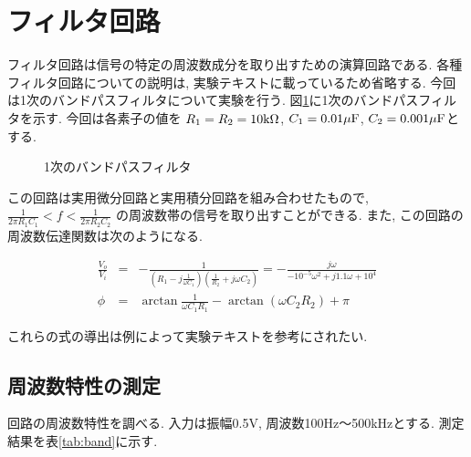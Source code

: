 \documentclass[titlepage]{jsarticle}
\begin{document}
\section{フィルタ回路}
    フィルタ回路は信号の特定の周波数成分を取り出すための演算回路である.
    各種フィルタ回路についての説明は,
    実験テキスト\cite{text}に載っているため省略する.
    今回は1次のバンドパスフィルタについて実験を行う.
    図\ref{fig:band}に1次のバンドパスフィルタを示す.
    今回は各素子の値を
    $R_1 = R_2 = 10\rm{k\Omega}$,
    $C_1 = 0.01\rm{\mu F}$,
    $C_2 = 0.001\rm{\mu F}$とする.

    \begin{figure}[h]
        \centering
        \caption{1次のバンドパスフィルタ}
        \label{fig:band}
    \end{figure}

    この回路は実用微分回路と実用積分回路を組み合わせたもので,
    $\displaystyle\frac{1}{2\pi R_1C_1} < f < \frac{1}{2\pi R_2C_2}$
    の周波数帯の信号を取り出すことができる.
    また, この回路の周波数伝達関数は次のようになる.

    \begin{eqnarray}
        \frac{V_o}{V_i} &=& -\frac{1}{\left(R_1-j\frac{1}{\omega C_1}\right)\left(\frac{1}{R_2}+j\omega C_2\right)} = -\frac{j\omega}{-10^{-5}\omega^2 + j1.1\omega + 10^{4}} \label{equ:band1} \\
        \phi &=& \arctan\frac{1}{\omega C_1R_1}-\arctan (\omega C_2R_2) + \pi \label{equ:band2}
    \end{eqnarray}

    これらの式の導出は例によって実験テキスト\cite{text}を参考にされたい.

    \subsection{周波数特性の測定}
        
        回路の周波数特性を調べる.
        入力は振幅0.5V,
        周波数100Hz〜500kHzとする.
        測定結果を表\ref{tab:band}に示す.
\end{document}
